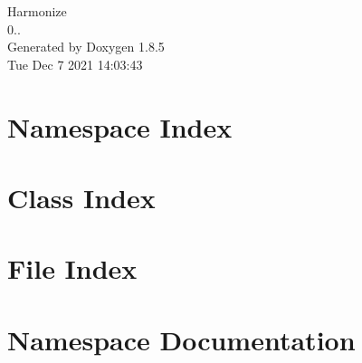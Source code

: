\documentclass[twoside]{book}
\newcommand{\clearemptydoublepage}{%
  \newpage{\pagestyle{empty}\cleardoublepage}%
}
\begin{document}
\hypersetup{pageanchor=false}
\begin{titlepage}
\vspace*{7cm}
\begin{center}%
{\Large Harmonize \\[1ex]\large 0.. }\\
\vspace*{1cm}
{\large Generated by Doxygen 1.8.5}\\
\vspace*{0.5cm}
{\small Tue Dec 7 2021 14:03:43}\\
\end{center}
\end{titlepage}
\clearemptydoublepage
\tableofcontents
\clearemptydoublepage
{}
\hypersetup{pageanchor=true}

\chapter{Namespace Index}

\chapter{Class Index}

\chapter{File Index}

\chapter{Namespace Documentation}

\end{document}
